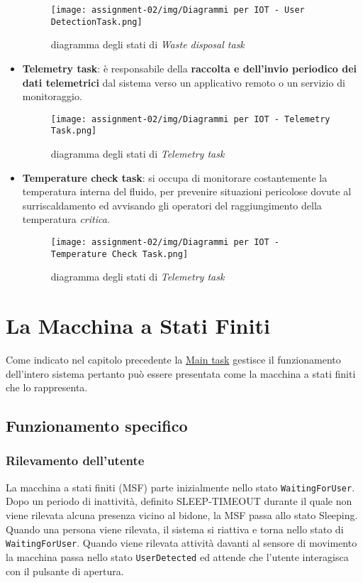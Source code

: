 \documentclass{report}
\begin{document}
\begin{itemize}
{    \begin{figure}[H]
        \centering
        \texttt{[image: assignment-02/img/Diagrammi per IOT - User DetectionTask.png]}
        \caption{diagramma degli stati di \textit{Waste disposal task}}
        \label{fig:waste-task}
    \end{figure}
    }
    \item {
    \textbf{Telemetry task}: è responsabile della \textbf{raccolta e dell'invio periodico dei dati telemetrici} dal sistema verso un applicativo remoto o un servizio di monitoraggio.
    \begin{figure}[H]
        \centering
        \texttt{[image: assignment-02/img/Diagrammi per IOT - Telemetry Task.png]}
        \caption{diagramma degli stati di \textit{Telemetry task}}
        \label{fig:telemetry-task}
    \end{figure}
    }
    \item {
    \textbf{Temperature check task}: si occupa di monitorare costantemente la temperatura interna del fluido, per prevenire situazioni pericolose dovute al surriscaldamento ed avvisando gli operatori del raggiungimento della temperatura \textit{critica}.
    \begin{figure}[H]
        \centering
        \texttt{[image: assignment-02/img/Diagrammi per IOT - Temperature Check Task.png]}
        \caption{diagramma degli stati di \textit{Telemetry task}}
        \label{fig:temperature-task}
    \end{figure}
    }
\end{itemize}

\chapter{La Macchina a Stati Finiti}
Come indicato nel capitolo precedente la \hyperref[fig:main-task]{Main task} gestisce il funzionamento dell'intero sistema pertanto può essere presentata come la macchina a stati finiti che lo rappresenta. 

\section{Funzionamento specifico}

\subsection{Rilevamento dell'utente}
\label{sub:utente}
\par {
La macchina a stati finiti (MSF) parte inizialmente nello stato \texttt{WaitingForUser}. Dopo un periodo di inattività, definito SLEEP-TIMEOUT durante il quale non viene rilevata alcuna presenza vicino al bidone, la MSF passa allo stato Sleeping. Quando una persona viene rilevata, il sistema si riattiva e torna nello stato di \texttt{WaitingForUser}.
Quando viene rilevata attività davanti al sensore di movimento la macchina passa nello stato \texttt{UserDetected} ed attende che l'utente interagisca con il pulsante di apertura.
}
\end{document}
